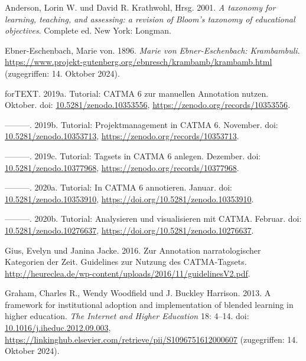 \documentclass[
          a4paper,
        ]{article}
\newlength{\cslhangindent}
\newenvironment{CSLReferences}[2] %
 {\begin{list}{}{%
  \setlength{\itemindent}{0pt}
  \setlength{\leftmargin}{0pt}
  \setlength{\parsep}{0pt}
  \ifodd #1
   \setlength{\leftmargin}{\cslhangindent}
   \setlength{\itemindent}{-1\cslhangindent}
  \fi
  \setlength{\itemsep}{#2\baselineskip}}}
 {\end{list}}
\begin{document}
\label{refs}
\begin{CSLReferences}{1}{0}
Anderson, Lorin W. und David R. Krathwohl, Hrsg. 2001. \emph{A taxonomy
for learning, teaching, and assessing: a revision of {Bloom}'s taxonomy
of educational objectives}. Complete ed. New York: Longman.

Ebner-Eschenbach, Marie von. 1896. \emph{Marie von {Ebner}-{Eschenbach}:
{Krambambuli}}.
\url{https://www.projekt-gutenberg.org/ebnresch/krambamb/krambamb.html}
(zugegriffen: 14. Oktober 2024).

forTEXT. 2019a. Tutorial: {CATMA} 6 zur manuellen {Annotation} nutzen.
Oktober. doi:
\href{https://doi.org/10.5281/zenodo.10353556}{10.5281/zenodo.10353556},
\url{https://zenodo.org/records/10353556}.

---------. 2019b. Tutorial: {Projektmanagement} in {CATMA} 6. November.
doi:
\href{https://doi.org/10.5281/zenodo.10353713}{10.5281/zenodo.10353713},
\url{https://zenodo.org/records/10353713}.

---------. 2019c. Tutorial: {Tagsets} in {CATMA} 6 anlegen. Dezember.
doi:
\href{https://doi.org/10.5281/zenodo.10377968}{10.5281/zenodo.10377968},
\url{https://zenodo.org/records/10377968}.

---------. 2020a. Tutorial: {In} {CATMA} 6 annotieren. Januar. doi:
\href{https://doi.org/10.5281/zenodo.10353910}{10.5281/zenodo.10353910},
\url{https://doi.org/10.5281/zenodo.10353910}.

---------. 2020b. Tutorial: {Analysieren} und visualisieren mit {CATMA}.
Februar. doi:
\href{https://doi.org/10.5281/zenodo.10276637}{10.5281/zenodo.10276637},
\url{https://doi.org/10.5281/zenodo.10276637}.

Gius, Evelyn und Janina Jacke. 2016. Zur {Annotation} narratologischer
{Kategorien} der {Zeit}. {Guidelines} zur {Nutzung} des
{CATMA}-{Tagsets}.
\url{http://heureclea.de/wp-content/uploads/2016/11/guidelinesV2.pdf}.

Graham, Charles R., Wendy Woodfield und J. Buckley Harrison. 2013. A
framework for institutional adoption and implementation of blended
learning in higher education. \emph{The Internet and Higher Education}
18: 4--14. doi:
\href{https://doi.org/10.1016/j.iheduc.2012.09.003}{10.1016/j.iheduc.2012.09.003},
\url{https://linkinghub.elsevier.com/retrieve/pii/S1096751612000607}
(zugegriffen: 14. Oktober 2024).


\end{CSLReferences}
\end{document}
